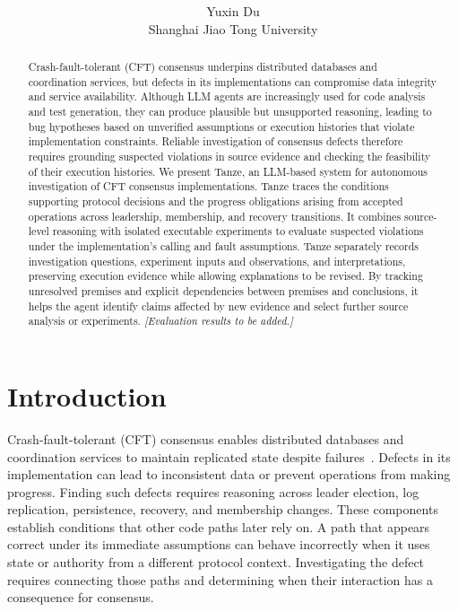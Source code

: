 \documentclass[10pt,twocolumn,letterpaper]{article}
\title{\vspace{-1.6em}\Large\bfseries \papertitle}
\author{Yuxin Du\\[0.2em]\normalsize Shanghai Jiao Tong University}
\date{}
\newcommand{\sys}{Tanze}
\begin{document}
\maketitle

\begin{abstract}
Crash-fault-tolerant (CFT) consensus underpins distributed databases and coordination services, but defects in its implementations can compromise data integrity and service availability. Although LLM agents are increasingly used for code analysis and test generation, they can produce plausible but unsupported reasoning, leading to bug hypotheses based on unverified assumptions or execution histories that violate implementation constraints. Reliable investigation of consensus defects therefore requires grounding suspected violations in source evidence and checking the feasibility of their execution histories. We present \sys{}, an LLM-based system for autonomous investigation of CFT consensus implementations. \sys{} traces the conditions supporting protocol decisions and the progress obligations arising from accepted operations across leadership, membership, and recovery transitions. It combines source-level reasoning with isolated executable experiments to evaluate suspected violations under the implementation's calling and fault assumptions. \sys{} separately records investigation questions, experiment inputs and observations, and interpretations, preserving execution evidence while allowing explanations to be revised. By tracking unresolved premises and explicit dependencies between premises and conclusions, it helps the agent identify claims affected by new evidence and select further source analysis or experiments. \textit{[Evaluation results to be added.]}
\end{abstract}

\section{Introduction}
\label{sec:intro}

Crash-fault-tolerant (CFT) consensus enables distributed databases and coordination services to maintain replicated state despite failures~\cite{raft}. Defects in its implementation can lead to inconsistent data or prevent operations from making progress. Finding such defects requires reasoning across leader election, log replication, persistence, recovery, and membership changes. These components establish conditions that other code paths later rely on. A path that appears correct under its immediate assumptions can behave incorrectly when it uses state or authority from a different protocol context. Investigating the defect requires connecting those paths and determining when their interaction has a consequence for consensus.
\end{document}
